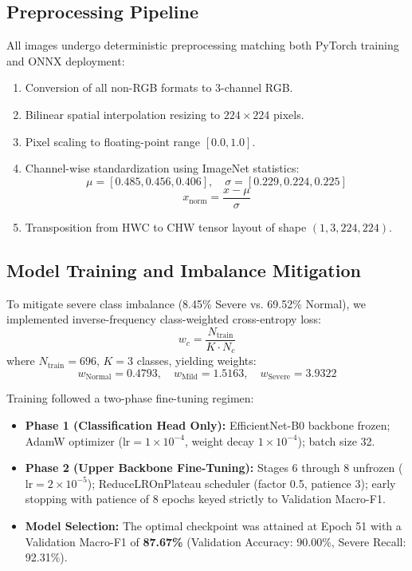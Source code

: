 \documentclass[conference]{IEEEtran}
\begin{document}
\subsection{Preprocessing Pipeline}
All images undergo deterministic preprocessing matching both PyTorch training and ONNX deployment:
\begin{enumerate}
    \item Conversion of all non-RGB formats to 3-channel RGB.
    \item Bilinear spatial interpolation resizing to $224 \times 224$ pixels.
    \item Pixel scaling to floating-point range $[0.0, 1.0]$.
    \item Channel-wise standardization using ImageNet statistics:
    $$\mu = [0.485, 0.456, 0.406], \quad \sigma = [0.229, 0.224, 0.225]$$
    $$x_{\text{norm}} = \frac{x - \mu}{\sigma}$$
    \item Transposition from HWC to CHW tensor layout of shape $(1, 3, 224, 224)$.
\end{enumerate}

\subsection{Model Training and Imbalance Mitigation}
To mitigate severe class imbalance (8.45\% Severe vs. 69.52\% Normal), we implemented inverse-frequency class-weighted cross-entropy loss:
\begin{equation}
w_c = \frac{N_{\text{train}}}{K \cdot N_c}
\end{equation}
where $N_{\text{train}} = 696$, $K = 3$ classes, yielding weights:
$$w_{\text{Normal}} = 0.4793, \quad w_{\text{Mild}} = 1.5163, \quad w_{\text{Severe}} = 3.9322$$

Training followed a two-phase fine-tuning regimen:
\begin{itemize}
    \item \textbf{Phase 1 (Classification Head Only):} EfficientNet-B0 backbone frozen; AdamW optimizer ($\text{lr} = 1 \times 10^{-4}$, weight decay $1 \times 10^{-4}$); batch size 32.
    \item \textbf{Phase 2 (Upper Backbone Fine-Tuning):} Stages 6 through 8 unfrozen ($\text{lr} = 2 \times 10^{-5}$); ReduceLROnPlateau scheduler (factor 0.5, patience 3); early stopping with patience of 8 epochs keyed strictly to Validation Macro-F1.
    \item \textbf{Model Selection:} The optimal checkpoint was attained at Epoch 51 with a Validation Macro-F1 of \textbf{87.67\%} (Validation Accuracy: 90.00\%, Severe Recall: 92.31\%).
\end{itemize}
\end{document}
